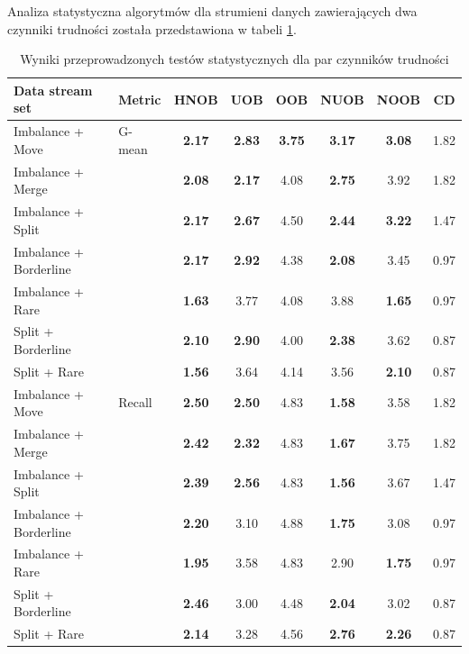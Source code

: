 Analiza statystyczna algorytmów dla strumieni danych zawierających dwa czynniki trudności została przedstawiona w tabeli \ref{Tab:DoubleDriftFriedmanHNOB}.

\newpage

\begin{table}[ht]
\centering\small%
\setlength{\tabcolsep}{10pt} 
\renewcommand{\arraystretch}{1.5} 
\begin{tabular}{l l c c c c c c}
\toprule
Data stream set & Metric & HNOB & UOB & OOB & NUOB & NOOB & CD \\
\midrule
Imbalance + Move & G-mean & \textbf{2.17} & \textbf{2.83} & \textbf{3.75} & \textbf{3.17} & \textbf{3.08} & 1.82 \\
Imbalance + Merge  & & \textbf{2.08} & \textbf{2.17} & 4.08 & \textbf{2.75} & 3.92 & 1.82 \\
Imbalance + Split  & & \textbf{2.17} & \textbf{2.67} & 4.50 & \textbf{2.44} & \textbf{3.22} & 1.47 \\
Imbalance + Borderline  & & \textbf{2.17} & \textbf{2.92} & 4.38 & \textbf{2.08} & 3.45 & 0.97 \\
Imbalance + Rare  & & \textbf{1.63} & 3.77 & 4.08 & 3.88 & \textbf{1.65} & 0.97 \\
Split + Borderline  & & \textbf{2.10} & \textbf{2.90} & 4.00 & \textbf{2.38} & 3.62 & 0.87 \\
Split + Rare  & & \textbf{1.56} & 3.64 & 4.14 & 3.56 & \textbf{2.10} & 0.87 \\
Imbalance + Move & Recall & \textbf{2.50} & \textbf{2.50} & 4.83 & \textbf{1.58} & 3.58 & 1.82 \\
Imbalance + Merge  & & \textbf{2.42} & \textbf{2.32} & 4.83 & \textbf{1.67} & 3.75 & 1.82 \\
Imbalance + Split  & & \textbf{2.39} & \textbf{2.56} & 4.83 & \textbf{1.56} & 3.67 & 1.47 \\
Imbalance + Borderline  & & \textbf{2.20} & 3.10 & 4.88 & \textbf{1.75} & 3.08 & 0.97 \\
Imbalance + Rare  & & \textbf{1.95} & 3.58 & 4.83 & 2.90 & \textbf{1.75} & 0.97 \\
Split + Borderline  & & \textbf{2.46} & 3.00 & 4.48 & \textbf{2.04} & 3.02 & 0.87 \\
Split + Rare  & & \textbf{2.14} & 3.28 & 4.56 & \textbf{2.76} & \textbf{2.26} & 0.87 \\
\bottomrule
\end{tabular}
\caption{Wyniki przeprowadzonych testów statystycznych dla par czynników trudności}\label{Tab:DoubleDriftFriedmanHNOB}
\end{table}

